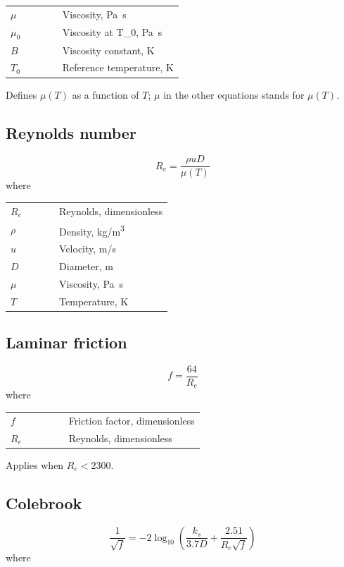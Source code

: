 \documentclass[11pt,a4paper]{article}
\begin{document}
\noindent\begin{tabular}{@{\quad}l@{\quad}p{0.7\linewidth}@{}}
  $\mu$ & Viscosity, \si{Pa.s} \\
  $\mu_0$ & Viscosity at T\_0, \si{Pa.s} \\
  $B$ & Viscosity constant, \si{K} \\
  $T_0$ & Reference temperature, \si{K} \\
\end{tabular}

\noindent Defines $\mu(T)$ as a function of $T$; $\mu$ in the other equations stands for $\mu(T)$.

\subsection{Reynolds number}
\begin{equation}
  R_e = \frac{\rho u D}{\mu(T)}
  \label{eq:reynolds-number}
\end{equation}
\noindent where

\noindent\begin{tabular}{@{\quad}l@{\quad}p{0.7\linewidth}@{}}
  $R_e$ & Reynolds, dimensionless \\
  $\rho$ & Density, \si{kg/m^{3}} \\
  $u$ & Velocity, \si{m/s} \\
  $D$ & Diameter, \si{m} \\
  $\mu$ & Viscosity, \si{Pa.s} \\
  $T$ & Temperature, \si{K} \\
\end{tabular}


\subsection{Laminar friction}
\begin{equation}
  f = \frac{64}{R_e}
  \label{eq:laminar-friction}
\end{equation}
\noindent where

\noindent\begin{tabular}{@{\quad}l@{\quad}p{0.7\linewidth}@{}}
  $f$ & Friction factor, dimensionless \\
  $R_e$ & Reynolds, dimensionless \\
\end{tabular}

\noindent Applies when $R_e < 2300$.

\subsection{Colebrook}
\begin{equation}
  \frac{1}{\sqrt{f}} = -2 \log_{10}\left(\frac{k_s}{3.7 D} + \frac{2.51}{R_e \sqrt{f}}\right)
  \label{eq:colebrook}
\end{equation}
\noindent where
\end{document}

